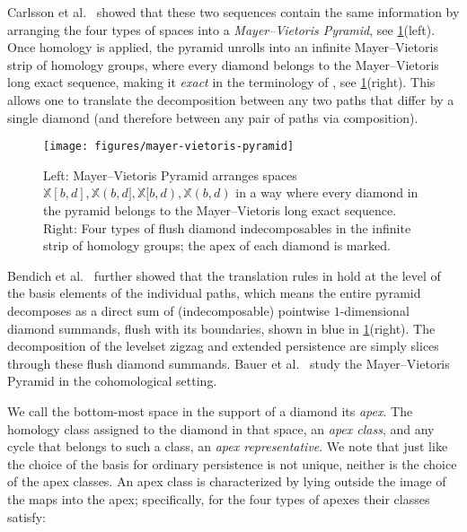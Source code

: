\documentclass[cleveref,a4paper,english,nolineno]{socg-lipics-v2021}
\newcommand{\Xsp}{\mathbb{X}}
\begin{document}
Carlsson et al.~\cite{CdSM09} showed that these two sequences contain the same
information by arranging the four types of spaces into a \emph{Mayer--Vietoris
Pyramid}, see \cref{fig:mayer-vietoris-pyramid}(left). Once homology is applied, the
pyramid unrolls into an infinite Mayer--Vietoris strip of homology groups,
where every diamond belongs to the Mayer--Vietoris long exact sequence,
making it \emph{exact} in the terminology of \cite{CdS10}, see
\cref{fig:mayer-vietoris-pyramid}(right).
This allows one to translate the decomposition between any two paths that differ
by a single diamond (and therefore between any pair of paths via composition).

\begin{figure}
    \centering
    \texttt{[image: figures/mayer-vietoris-pyramid]}
    \caption{Left: Mayer--Vietoris Pyramid arranges spaces $\Xsp[b,d], \Xsp(b,d],
             \Xsp[b,d), \Xsp(b,d)$ in a way where every diamond in the pyramid belongs to
             the Mayer--Vietoris long exact sequence. Right: Four types of flush
             diamond indecomposables in the infinite strip of homology groups;
             the apex of each diamond is marked.}
    \label{fig:mayer-vietoris-pyramid}
\end{figure}

Bendich et al.~\cite{BEMP13} further showed that the translation rules in
\cite{CdSM09} hold at the level of the basis elements of the individual paths,
which means the entire pyramid decomposes as a direct sum of
(indecomposable) pointwise $1$-dimensional diamond summands, flush with its boundaries, shown in blue in \cref{fig:mayer-vietoris-pyramid}(right). The decomposition
of the levelset zigzag and extended persistence are simply slices through these
flush diamond summands.
Bauer et al.~\cite{BBF21} study the Mayer--Vietoris Pyramid in the cohomological setting.

We call the bottom-most space in the support of a diamond its \emph{apex}. The
homology class assigned to the diamond in that space, an \emph{apex class}, and
any cycle that belongs to such a class, an \emph{apex representative}.
We note that just like the choice of the basis for ordinary persistence is not
unique, neither is the choice of the apex classes.
An apex class is characterized by lying outside the image of the maps into the
apex; specifically, for the four types of apexes their classes satisfy:
\end{document}
